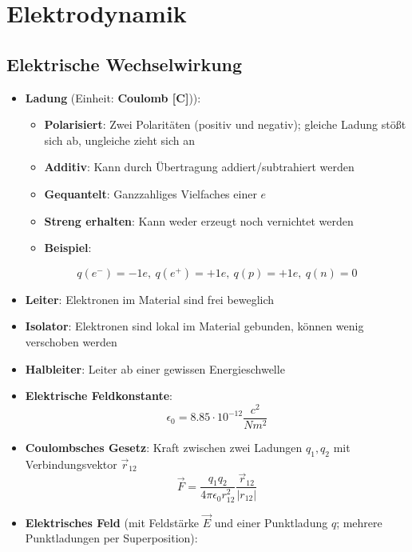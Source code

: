 \section{Elektrodynamik}%
\label{edyn:sec:elektrodynamik}

\subsection{Elektrische Wechselwirkung}%
\label{edyn:sub:elektrische_wechselwirkung}

\begin{itemize}
	\item \textbf{Ladung} (Einheit: \textbf{Coulomb [C]})):
	\begin{itemize}
		\item \textbf{Polarisiert}: Zwei Polaritäten (positiv und negativ); gleiche Ladung stößt sich ab, ungleiche zieht sich an
		\item \textbf{Additiv}: Kann durch Übertragung addiert/subtrahiert werden
		\item \textbf{Gequantelt}: Ganzzahliges Vielfaches einer  $e$
		\item \textbf{Streng erhalten}: Kann weder erzeugt noch vernichtet werden
		\item \textbf{Beispiel}:
	\end{itemize}
	\begin{equation}
		q(e^-) = -1e,\ q(e^+) = +1e,\ q(p) = +1e,\ q(n) = 0
	\end{equation}
	\item \textbf{Leiter}: Elektronen im Material sind frei beweglich
	\item \textbf{Isolator}: Elektronen sind lokal im Material gebunden, können wenig verschoben werden
	\item \textbf{Halbleiter}: Leiter ab einer gewissen Energieschwelle
	\item \textbf{Elektrische Feldkonstante}:
	\begin{equation}
		\epsilon_0 = 8.85 \cdot 10^{-12} \frac{c^2}{Nm^2}
	\end{equation}
	\item \textbf{Coulombsches Gesetz}: Kraft zwischen zwei Ladungen $q_1, q_2$ mit Verbindungsvektor $\vec{r}_{12}$
	\begin{equation}
		\vec{F} = \frac{q_1q_2}{4\pi\epsilon_0r_{12}^2}\frac{\vec{r}_{12}}{|r_{12}|}
	\end{equation}
	\item \textbf{Elektrisches Feld} (mit Feldstärke $\vec{E}$ und einer Punktladung $q$; mehrere Punktladungen per Superposition):

\end{itemize}
